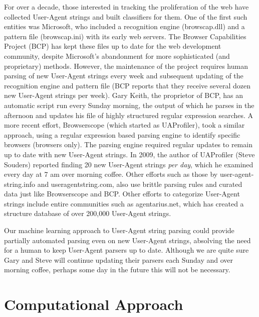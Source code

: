 \documentclass[10pt]{article}
\begin{document}
For over a decade, those interested in tracking the proliferation of the web have collected User-Agent strings and built classifiers for them.  One of the first such entities was Microsoft, who included a recognition engine (browscap.dll) and a pattern file (browscap.ini) with its early web servers.\cite{bcp}  The Browser Capabilities Project (BCP) has kept these files up to date for the web development community, despite Microsoft's abandonment for more sophisticated (and proprietary) methods.\cite{bcp}  However, the maintenance of the project requires human parsing of new User-Agent strings every week and subsequent updating of the recognition engine and pattern file (BCP reports that they receive several dozen new User-Agent strings per week).  Gary Keith, the proprietor of BCP, has an automatic script run every Sunday morning, the output of which he parses in the afternoon and updates his file of highly structured regular expression searches.  A more recent effort, Browserscope (which started as UAProfiler), took a similar approach, using a regular expression based parsing engine to identify specific browsers (browsers only). \cite{souders}  The parsing engine required regular updates to remain up to date with new User-Agent strings.  In 2009, the author of UAProfiler (Steve Souders) reported finding 20 new User-Agent strings {\it per day}, which he examined every day at 7 am over morning coffee. \cite{souders2}  Other efforts such as those by user-agent-string.info and useragentstring.com, also use brittle parsing rules and curated data just like Browserscope and BCP.  \cite{uas.info,uas.com}  Other efforts to categorize User-Agent strings include entire communities such as agentarius.net, which has created a structure database of over 200,000 User-Agent strings.   

Our machine learning approach to User-Agent string parsing could provide partially automated parsing even on new User-Agent strings, absolving the need for a human to keep User-Agent parsers up to date.  Although we are quite sure Gary and Steve will continue updating their parsers each Sunday and over morning coffee, perhaps some day in the future this will not be necessary.

\section{Computational Approach}
\end{document}
